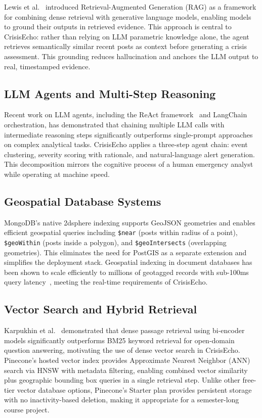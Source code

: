 \documentclass[conference]{IEEEtran}
\begin{document}
Lewis et al.~\cite{lewis2020rag} introduced Retrieval-Augmented Generation (RAG)
as a framework for combining dense retrieval with generative language models,
enabling models to ground their outputs in retrieved evidence. This approach is
central to CrisisEcho: rather than relying on LLM parametric knowledge alone,
the agent retrieves semantically similar recent posts as context before generating
a crisis assessment. This grounding reduces hallucination and anchors the LLM
output to real, timestamped evidence.

\subsection{LLM Agents and Multi-Step Reasoning}

Recent work on LLM agents, including the ReAct framework~\cite{yao2023react}
and LangChain orchestration, has demonstrated that chaining multiple LLM calls
with intermediate reasoning steps significantly outperforms single-prompt
approaches on complex analytical tasks. CrisisEcho applies a three-step agent
chain: event clustering, severity scoring with rationale, and natural-language
alert generation. This decomposition mirrors the cognitive process of a human
emergency analyst while operating at machine speed.

\subsection{Geospatial Database Systems}

MongoDB's native 2dsphere indexing supports GeoJSON geometries and enables
efficient geospatial queries including \texttt{\$near} (posts within radius of
a point), \texttt{\$geoWithin} (posts inside a polygon), and
\texttt{\$geoIntersects} (overlapping geometries). This eliminates the need for
PostGIS as a separate extension and simplifies the deployment stack. Geospatial
indexing in document databases has been shown to scale efficiently to millions
of geotagged records with sub-100ms query latency~\cite{mongodb2023geo},
meeting the real-time requirements of CrisisEcho.

\subsection{Vector Search and Hybrid Retrieval}

Karpukhin et al.~\cite{karpukhin2020dense} demonstrated that dense passage
retrieval using bi-encoder models significantly outperforms BM25 keyword
retrieval for open-domain question answering, motivating the use of dense
vector search in CrisisEcho. Pinecone's hosted vector index provides
Approximate Nearest Neighbor (ANN) search via HNSW with metadata filtering,
enabling combined vector similarity plus geographic bounding box queries in a
single retrieval step. Unlike other free-tier vector database options, Pinecone's
Starter plan provides persistent storage with no inactivity-based deletion,
making it appropriate for a semester-long course project.
\end{document}
